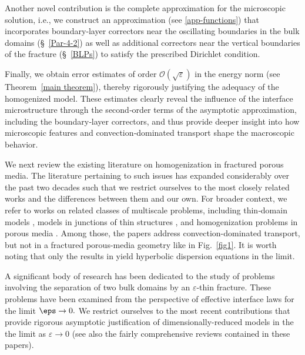 \documentclass[reqno]{amsart}            %
\numberwithin{equation}{section}
\begin{document}
	Another novel contribution 	is the  complete approximation for the microscopic solution, i.e., 	we construct an approximation (see \eqref{app-functions}) that incorporates boundary‑layer correctors near the oscillating boundaries in the bulk domains (\S~\ref{Par-4-2}) as well as additional correctors near the vertical boundaries of the fracture  (\S~\ref{BLPs}) to satisfy the prescribed Dirichlet condition.
	
	
	Finally, we obtain error estimates of order $\mathcal{O}(\sqrt{\varepsilon })$ in the energy norm (see Theorem~\ref{main theorem}), thereby rigorously justifying the adequacy of the homogenized model. These estimates clearly reveal the influence of the interface microstructure through the second‑order terms of the asymptotic approximation, including the boundary‑layer correctors, and thus provide deeper insight into how microscopic features and convection‑dominated transport shape the macroscopic behavior. 
	
	\medskip 
	
	We next review the existing literature on homogenization in fractured porous media.
	 The literature pertaining to such issues has expanded considerably over the past two decades such that we restrict ourselves to the most closely related works and the differences between them and our own. For broader context, we  refer to works on related classes of multiscale problems, including thin‑domain models \cite{Arrieta-2025,Macrone-2024,MvD11,Mel-Roh_Non-Diff-2024}, models in junctions of thin structures \cite{Bun-Gau-2026,Gau-Pan-2026,Mel-Roh_AsAn-2024,Mel-Roh_JMAA-2024}, and homogenization problems in porous media \cite{AMP10,Bha-Gah-Rad-2022,Gahn-Radu-Pop-2021,Gahn-Pop-2023,Donato-2025,Melnyk-2026,RdBCM25}.  Among those, the papers \cite{AMP10,MvD11,Mel-Roh_AsAn-2024,Mel-Roh_JMAA-2024,Mel-Roh_Non-Diff-2024,RdBCM25} address convection-dominated transport, but not in a fractured porous-media geometry like in Fig.~\ref{fig1}.
	It is worth noting that only the results in \cite{MvD11,Mel-Roh_AsAn-2024,Mel-Roh_JMAA-2024,Mel-Roh_Non-Diff-2024} yield hyperbolic dispersion equations in the limit.
	
	A significant body of research has been dedicated to the study of problems involving the  separation of two bulk domains by  an  $\varepsilon\!$-thin fracture. These problems have been examined from the perspective of effective interface laws for the limit $\eps\to 0.$ We  restrict ourselves  to the most recent contributions \cite{Gahn-Radu-2018,Gahn-Jag-Radu-2022,Gahn-Radu-2025,Gahn-2025,Freud-Eden-2024,Freud-Eden-2025,Lis-Kum-Pop-Rad-2020,Pop-Bog-Kum-2017} that provide rigorous asymptotic justification of dimensionally-reduced models in the the limit as $\varepsilon \to 0$ (see also the fairly comprehensive reviews contained in these papers).
	
\end{document}
